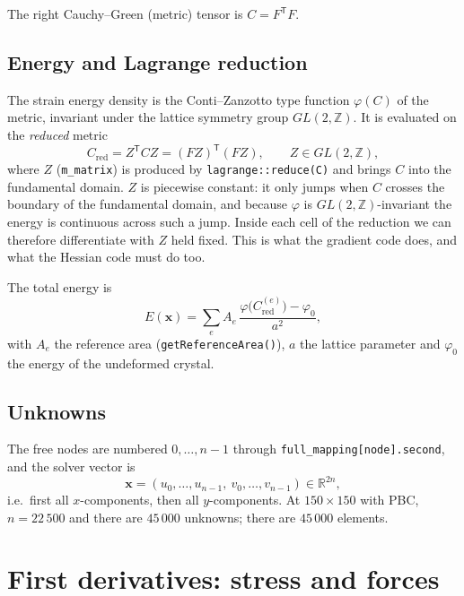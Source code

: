 \documentclass[11pt,a4paper]{article}
\theoremstyle{remark}
\newcommand{\R}{\mathbb{R}}
\newcommand{\x}{\bm{x}}
\newcommand{\Cred}{C_{\mathrm{red}}}
\newcommand{\T}{^{\mathsf T}}
\newcommand{\code}[1]{\texttt{#1}}
\begin{document}
The right Cauchy--Green (metric) tensor is $C=F\T F$.

\subsection{Energy and Lagrange reduction}

The strain energy density is the Conti--Zanzotto type function $\varphi(C)$ of the metric,
invariant under the lattice symmetry group $GL(2,\mathbb{Z})$. It is evaluated on the
\emph{reduced} metric
\begin{equation}
\Cred = Z\T C Z = (FZ)\T(FZ), \qquad Z\in GL(2,\mathbb{Z}),
\end{equation}
where $Z$ (\code{m\_\allowbreak{}matrix}) is produced by \code{lagrange::\allowbreak{}reduce(C)} and brings $C$ into
the fundamental domain. $Z$ is piecewise constant: it only jumps when $C$ crosses the
boundary of the fundamental domain, and because $\varphi$ is $GL(2,\mathbb{Z})$-invariant
the energy is continuous across such a jump. Inside each cell of the reduction we can
therefore differentiate with $Z$ held fixed. This is what the gradient code does, and what
the Hessian code must do too.

The total energy is
\begin{equation}
E(\x) = \sum_{e} A_e\,\frac{\varphi\big(\Cred^{(e)}\big) - \varphi_0}{a^2},
\label{eq:E}
\end{equation}
with $A_e$ the reference area (\code{getReferenceArea()}), $a$ the lattice parameter and
$\varphi_0$ the energy of the undeformed crystal.

\subsection{Unknowns}

The free nodes are numbered $0,\dots,n-1$ through \code{full\_\allowbreak{}mapping[node].second}, and
the solver vector is
\begin{equation}
\x = (u_0,\dots,u_{n-1},\ v_0,\dots,v_{n-1}) \in \R^{2n},
\end{equation}
i.e.\ first all $x$-components, then all $y$-components. At $150\times150$ with PBC,
$n=22\,500$ and there are $45\,000$ unknowns; there are $45\,000$ elements.

\section{First derivatives: stress and forces}
\end{document}
